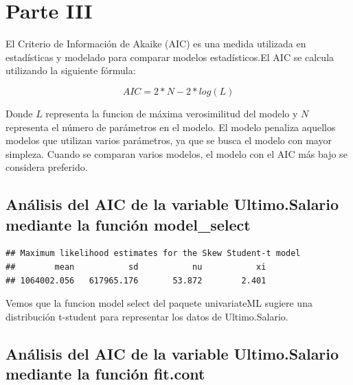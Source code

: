 \documentclass[
]{article}
\newenvironment{Shaded}{\begin{snugshade}}{\end{snugshade}}
\newcommand{\FunctionTok}[1]{\textcolor[rgb]{0.13,0.29,0.53}{\textbf{#1}}}
\newcommand{\NormalTok}[1]{#1}
\newcommand{\SpecialCharTok}[1]{\textcolor[rgb]{0.81,0.36,0.00}{\textbf{#1}}}
\begin{document}
\hypertarget{parte-iii}{%
\section{Parte III}\label{parte-iii}}

El Criterio de Información de Akaike (AIC) es una medida utilizada en
estadísticas y modelado para comparar modelos estadísticos.El AIC se
calcula utilizando la siguiente fórmula:

\[ AIC= 2*N−2*log(L) \]

Donde \(L\) representa la funcion de máxima verosimilitud del modelo y
\(N\) representa el número de parámetros en el modelo. El modelo
penaliza aquellos modelos que utilizan varios parámetros, ya que se
busca el modelo con mayor simpleza. Cuando se comparan varios modelos,
el modelo con el AIC más bajo se considera preferido.

\hypertarget{anuxe1lisis-del-aic-de-la-variable-ultimo.salario-mediante-la-funciuxf3n-model_select}{%
\subsection{Análisis del AIC de la variable Ultimo.Salario mediante la
función
model\_select}\label{anuxe1lisis-del-aic-de-la-variable-ultimo.salario-mediante-la-funciuxf3n-model_select}}

\begin{Shaded}
\end{Shaded}

\begin{verbatim}
## Maximum likelihood estimates for the Skew Student-t model 
##        mean           sd           nu           xi  
## 1064002.056   617965.176       53.872        2.401
\end{verbatim}

Vemos que la funcion model select del paquete univariateML sugiere una
distribución t-student para representar los datos de Ultimo.Salario.

\hypertarget{anuxe1lisis-del-aic-de-la-variable-ultimo.salario-mediante-la-funciuxf3n-fit.cont}{%
\subsection{Análisis del AIC de la variable Ultimo.Salario mediante la
función
fit.cont}\label{anuxe1lisis-del-aic-de-la-variable-ultimo.salario-mediante-la-funciuxf3n-fit.cont}}
\end{document}
